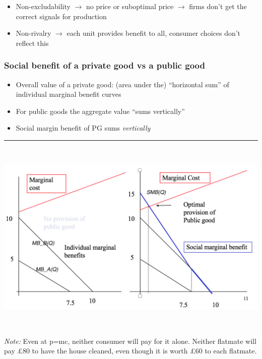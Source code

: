 \documentclass[]{article}
\begin{document}
\begin{itemize}
\item
  Non-excludability \(\rightarrow\) no price or suboptimal price
  \(\rightarrow\) firms don't get the correct signals for production
\item
  Non-rivalry \(\rightarrow\) each unit provides benefit to all,
  consumer choices don't reflect this
\end{itemize}

\hypertarget{social-benefit-of-a-private-good-vs-a-public-good}{%
\subsubsection{Social benefit of a private good vs a public
good}\label{social-benefit-of-a-private-good-vs-a-public-good}}

\begin{itemize}
\item
  Overall value of a private good: (area under the) ``horizontal sum''
  of individual marginal benefit curves
\item
  For public goods the aggregate value ``sums vertically''
\item
  Social margin benefit of PG sums \emph{vertically}
\end{itemize}

\begin{center}\rule{0.5\linewidth}{\linethickness}\end{center}

\includegraphics[height=3.7in]{picsfigs/pgprovision1.png}

\emph{Note:} Even at p=mc, neither consumer will pay for it alone.
Neither flatmate will pay £80 to have the house cleaned, even though it
is worth £60 to each flatmate.\\
\end{document}
